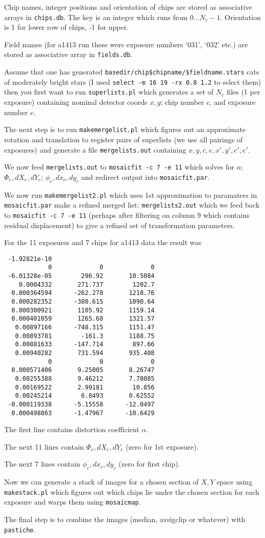Chip names, integer positions and orientation of chips are stored
as associative arrays in {\tt chips.db}.  The key is an integer
which runs from $0\ldots N_c - 1$.  Orientation is 1 for lower
row of chips, -1 for upper.

Field names (for a1413 run these were exposure numbers `031',
`032' etc.) are stored as associative array in {\tt fields.db}.

Assume that one has generated 
{\tt basedir/chip\$chipname/\$fieldname.stars}
cats of moderately bright stars
(I used
{\tt select -m 16 19 -rx 0.8 1.2} to select them) then
you first want to run {\tt superlists.pl} which generates
a set of $N_e$ files  (1 per exposure) containing 
nominal detector coords $x,y$; chip number $c$, and exposure
number $e$.

The next step is to run {\tt makemergelist.pl} which figures
out an approximate rotation and translation to register pairs of
superlists (we use all pairings of exposures) and generate a
file {\tt mergelists.out} containing $x,y,c,e,x',y',c',e'$.

We now feed {\tt mergelists.out} to {\tt mosaicfit -c 7 -e 11}
which solves for $\alpha$; $\Phi_e, dX_e, dY_e$; $\phi_c, dx_c, dy_c$
and redirect output into {\tt mosaicfit.par}.

We now run {\tt makemergelist2.pl} which uses 1st approximation
to paramaters in {\tt mosaicfit.par} make a refined
merged list: {\tt mergelists2.out} which we feed back to
{\tt mosaicfit -c 7 -e 11} (perhaps after filtering on
column 9 which contains residual displacement) to give
a refined set of transformation parameters.

For the 11 exposures and 7 chips for a1413 data the result was
\begin{verbatim}
 -1.92821e-10
            0             0             0
 -6.01328e-05        296.92       10.5084
    0.0004332       271.737        1202.7
  0.000364594      -262.278       1218.76
  0.000282352      -380.615       1090.64
  0.000300921       1105.92       1159.14
  0.000401059       1265.68       1321.57
   0.00897166      -748.315       1151.47
   0.00893781        -161.3       1188.75
   0.00881633      -147.714        897.66
   0.00940282       731.594       935.408
            0             0             0
  0.000571406       9.25005       8.26747
   0.00255388       9.46212       7.78085
   0.00169522       2.99181        10.856
   0.00245214        6.8493       0.62552
 -0.000119338      -5.15558      -12.0497
  0.000498863      -1.47967      -10.6429
\end{verbatim}

The first line contains distortion coefficient $\alpha$.

The next 11 lines contain $\Phi_e, dX_e, dY_e$ (zero for
1st exposure).

The next 7 lines contain $\phi_c, dx_c, dy_c$ (zero for
first chip).

Now we can generate a stack of images for a chosen section
of $X,Y$ space using {\tt makestack.pl} which figures out
which chips lie under the chosen section for each exposure and 
warps them using {\tt mosaicmap}.

The final step is to combine the images (median, avsigclip
or whatever) with {\tt pastiche}.


